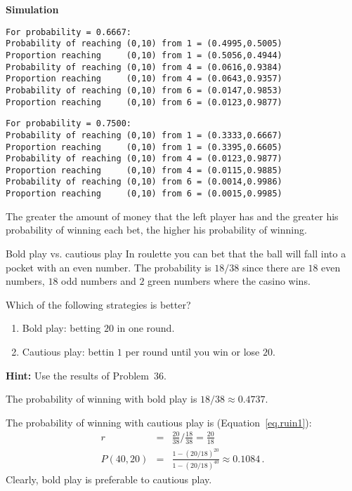 \textbf{Simulation}
\begin{verbatim}
For probability = 0.6667:
Probability of reaching (0,10) from 1 = (0.4995,0.5005)
Proportion reaching     (0,10) from 1 = (0.5056,0.4944)
Probability of reaching (0,10) from 4 = (0.0616,0.9384)
Proportion reaching     (0,10) from 4 = (0.0643,0.9357)
Probability of reaching (0,10) from 6 = (0.0147,0.9853)
Proportion reaching     (0,10) from 6 = (0.0123,0.9877)
\end{verbatim}

\begin{verbatim}
For probability = 0.7500:
Probability of reaching (0,10) from 1 = (0.3333,0.6667)
Proportion reaching     (0,10) from 1 = (0.3395,0.6605)
Probability of reaching (0,10) from 4 = (0.0123,0.9877)
Proportion reaching     (0,10) from 4 = (0.0115,0.9885)
Probability of reaching (0,10) from 6 = (0.0014,0.9986)
Proportion reaching     (0,10) from 6 = (0.0015,0.9985)
\end{verbatim}
The greater the amount of money that the left player has and the greater his probability of winning each bet, the higher his probability of winning.


\begin{prob}{Bold play vs. cautious play}
In roulette you can bet that the ball will fall into a pocket with an even number. The probability is $18/38$ since there are $18$ even numbers, $18$ odd numbers and $2$ green numbers where the casino wins.

Which of the following strategies is better?
\begin{enumerate}
\item Bold play: betting $20$ in one round.
\item Cautious play: bettin $1$ per round until you win or lose $20$.
\end{enumerate}
\textbf{Hint:} Use the results of Problem~36.
\end{prob}

\solution{}

The probability of winning with bold play is $18/38\approx 0.4737$.

The probability of winning with cautious play is (Equation~\ref{eq.ruin1}):
\begin{eqnarray*}
r&=&\frac{20}{38}\Big/ \frac{18}{38}=\frac{20}{18}\\
P(40,20) &=&
\frac{1-(20/18)^{20}}{1-(20/18)^{40}}\approx 0.1084\,.
\end{eqnarray*}
Clearly, bold play is preferable to cautious play.

